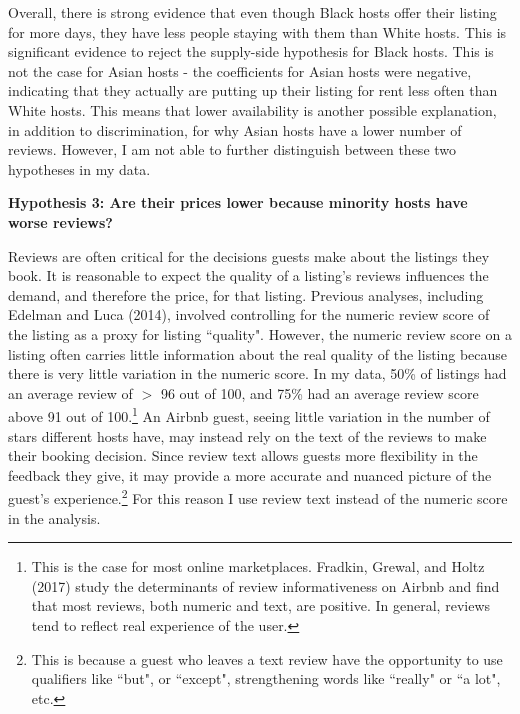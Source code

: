 \documentclass[11pt, oneside]{article}
\begin{document}
Overall, there is strong evidence that even though Black hosts offer their listing for more days, they have less people staying with them than White hosts. This is significant evidence to reject the supply-side hypothesis for Black hosts. This is not the case for Asian hosts - the coefficients for Asian hosts were negative, indicating that they actually are putting up their listing for rent less often than White hosts. This means that lower availability is another possible explanation, in addition to discrimination, for why Asian hosts have a lower number of reviews. However, I am not able to further distinguish between these two hypotheses in my data.  

\textbf{Hypothesis 3: Are their prices lower because minority hosts have worse reviews?} 

Reviews are often critical for the decisions guests make about the listings they book. It is reasonable to expect the quality of a listing's reviews influences the demand, and therefore the price, for that listing. Previous analyses, including Edelman and Luca (2014), involved controlling for the numeric review score of the listing as a proxy for listing ``quality". However, the numeric review score on a listing often carries little information about the real quality of the listing because there is very little variation in the numeric score. In my data, 50\% of listings had an average review of $>$ 96 out of 100, and 75\% had an average review score above 91 out of 100.\footnote{This is the case for most online marketplaces. Fradkin, Grewal, and Holtz (2017) study the determinants of review informativeness on Airbnb and find that most reviews, both numeric and text, are positive. In general, reviews tend to reflect real experience of the user.\cite{fradkin}} An Airbnb guest, seeing little variation in the number of stars different hosts have, may instead rely on the text of the reviews to make their booking decision. Since review text allows guests more flexibility in the feedback they give, it may provide a more accurate and nuanced picture of the guest's experience.\footnote{This is because a guest who leaves a text review have the opportunity to use qualifiers like ``but", or ``except", strengthening words like ``really" or ``a lot", etc.} For this reason I use review text instead of the numeric score in the analysis. 
\end{document}

